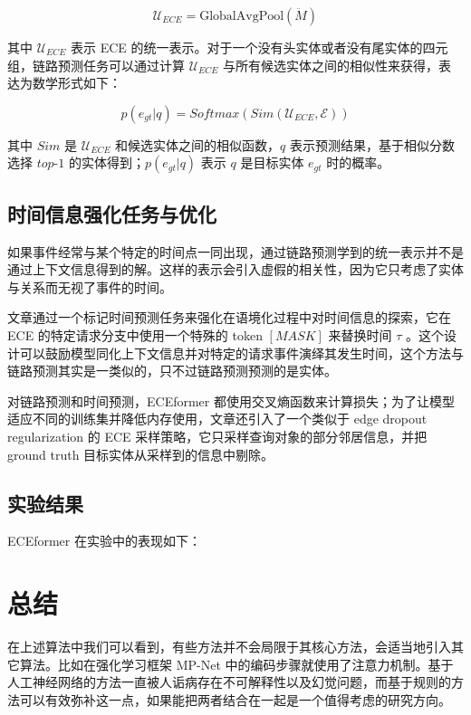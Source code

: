\documentclass[a4paper, AutoFakeBold]{article}
\begin{document}
\begin{equation}
{\mathcal U}_{ECE}=\text{GlobalAvgPool}(\ddot{M})
\end{equation}

其中 ${\mathcal U}_{ECE}$ 表示 ECE 的统一表示。对于一个没有头实体或者没有尾实体的四元组，链路预测任务可以通过计算 ${\mathcal U}_{ECE}$ 与所有候选实体之间的相似性来获得，表达为数学形式如下：

\begin{equation}
p(e_{gt}|q)=Softmax(Sim(\mathcal{U}_{ECE},\mathcal{E}))
\end{equation}

其中 $Sim$ 是 $\mathcal{U}_{ECE}$ 和候选实体之间的相似函数，$q$ 表示预测结果，基于相似分数选择 $top\text{-}1$ 的实体得到；$p(e_{gt}|q)$ 表示 $q$ 是目标实体 $e_{gt}$ 时的概率。


\subsection{时间信息强化任务与优化}

如果事件经常与某个特定的时间点一同出现，通过链路预测学到的统一表示并不是通过上下文信息得到的解。这样的表示会引入虚假的相关性，因为它只考虑了实体与关系而无视了事件的时间。

文章通过一个标记时间预测任务来强化在语境化过程中对时间信息的探索，它在 ECE 的特定请求分支中使用一个特殊的 token $[MASK]$ 来替换时间 $\tau$ 。这个设计可以鼓励模型同化上下文信息并对特定的请求事件演绎其发生时间，这个方法与链路预测其实是一类似的，只不过链路预测预测的是实体。

对链路预测和时间预测，ECEformer 都使用交叉熵函数来计算损失；为了让模型适应不同的训练集并降低内存使用，文章还引入了一个类似于 edge dropout regularization 的 ECE 采样策略，它只采样查询对象的部分邻居信息，并把 ground truth 目标实体从采样到的信息中剔除。


\subsection{实验结果}

ECEformer 在实验中的表现如下：


\section{总结}

在上述算法中我们可以看到，有些方法并不会局限于其核心方法，会适当地引入其它算法。比如在强化学习框架 MP-Net 中的编码步骤就使用了注意力机制。基于人工神经网络的方法一直被人诟病存在不可解释性以及幻觉问题，而基于规则的方法可以有效弥补这一点，如果能把两者结合在一起是一个值得考虑的研究方向。





\end{document}
